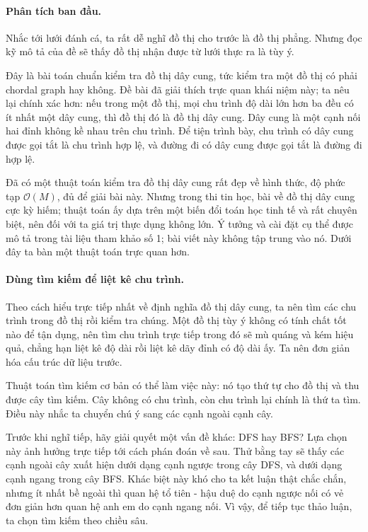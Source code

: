 \documentclass[11pt]{article}
\newcommand{\Oh}{\mathcal{O}}
\begin{document}
\paragraph{Phân tích ban đầu.}
Nhắc tới lưới đánh cá, ta rất dễ nghĩ đồ thị cho trước là đồ thị phẳng. Nhưng
đọc kỹ mô tả của đề sẽ thấy đồ thị nhận được từ lưới thực ra là tùy ý.

Đây là bài toán chuẩn kiểm tra đồ thị dây cung, tức kiểm tra một đồ thị có
phải chordal graph hay không. Đề bài đã giải thích trực quan khái niệm này;
ta nêu lại chính xác hơn: nếu trong một đồ thị, mọi chu trình độ dài lớn hơn
ba đều có ít nhất một dây cung, thì đồ thị đó là đồ thị dây cung. Dây cung là
một cạnh nối hai đỉnh không kề nhau trên chu trình. Để tiện trình bày, chu
trình có dây cung được gọi tắt là chu trình hợp lệ, và đường đi có dây cung
được gọi tắt là đường đi hợp lệ.

Đã có một thuật toán kiểm tra đồ thị dây cung rất đẹp về hình thức, độ phức
tạp \(\Oh(M)\), đủ để giải bài này. Nhưng trong thi tin học, bài về đồ thị
dây cung cực kỳ hiếm; thuật toán ấy dựa trên một biến đổi toán học tinh tế và
rất chuyên biệt, nên đối với ta giá trị thực dụng không lớn. Ý tưởng và cài
đặt cụ thể được mô tả trong tài liệu tham khảo số 1; bài viết này không tập
trung vào nó. Dưới đây ta bàn một thuật toán trực quan hơn.

\paragraph{Dùng tìm kiếm để liệt kê chu trình.}
Theo cách hiểu trực tiếp nhất về định nghĩa đồ thị dây cung, ta nên tìm các
chu trình trong đồ thị rồi kiểm tra chúng. Một đồ thị tùy ý không có tính chất
tốt nào để tận dụng, nên tìm chu trình trực tiếp trong đó sẽ mù quáng và kém
hiệu quả, chẳng hạn liệt kê độ dài rồi liệt kê dãy đỉnh có độ dài ấy. Ta nên
đơn giản hóa cấu trúc dữ liệu trước.

Thuật toán tìm kiếm cơ bản có thể làm việc này: nó tạo thứ tự cho đồ thị và
thu được cây tìm kiếm. Cây không có chu trình, còn chu trình lại chính là thứ
ta tìm. Điều này nhắc ta chuyển chú ý sang các cạnh ngoài cạnh cây.

Trước khi nghĩ tiếp, hãy giải quyết một vấn đề khác: DFS hay BFS? Lựa chọn
này ảnh hưởng trực tiếp tới cách phán đoán về sau. Thử bằng tay sẽ thấy các
cạnh ngoài cây xuất hiện dưới dạng cạnh ngược trong cây DFS, và dưới dạng
cạnh ngang trong cây BFS. Khác biệt này khó cho ta kết luận thật chắc chắn,
nhưng ít nhất bề ngoài thì quan hệ tổ tiên - hậu duệ do cạnh ngược nối có vẻ
đơn giản hơn quan hệ anh em do cạnh ngang nối. Vì vậy, để tiếp tục thảo luận,
ta chọn tìm kiếm theo chiều sâu.
\end{document}
